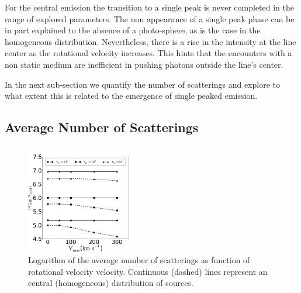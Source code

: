 \documentclass{emulateapj}
\begin{document}

For the central emission the transition to a single peak is never
completed in the range of explored parameters. The non appearance
of a single peak phase can be in part explained to the absence of a
photo-sphere, as is the case in the homogeneous
distribution. Nevertheless, there is a rise in the intensity at the
line center as the rotational velocity increases. This hints that the
encounters with a non static medium are inefficient in pushing photons
outside the line's center.

In the next sub-section we quantify the number of scatterings and explore
to what extent this is related to the emergence of single peaked emission. 

\subsection{Average Number of Scatterings}


\begin{figure}
    \includegraphics[width=0.45\textwidth]{NscattvsVmax.png}
\caption{Logarithm of the average number of scatterings as function of
  rotational velocity velocity. Continuous (dashed) lines represent an
  central (homogeneous) distribution of sources. \label{fig:Nscatt}}    
\end{figure}
\end{document}
